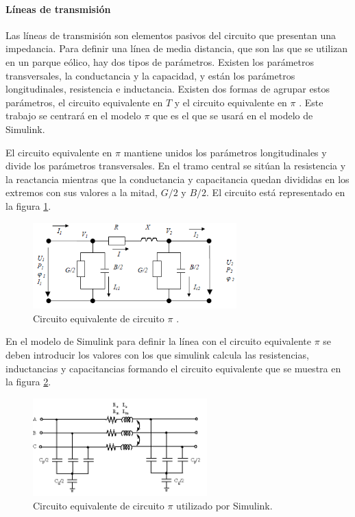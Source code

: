 \documentclass{book}
\begin{document}
		\paragraph {L\'ineas de transmisi\'on}

Las l\'ineas de transmisi\'on son elementos pasivos del circuito que presentan una impedancia. Para definir una l\'inea de media distancia, que son las que se utilizan en un parque e\'olico, hay dos tipos de par\'ametros. Existen los par\'ametros transversales, la conductancia y la capacidad, y est\'an los  par\'ametros longitudinales, resistencia e inductancia. Existen dos formas de agrupar estos par\'ametros, el circuito equivalente en $T$ y el circuito equivalente en $\pi$ \cite{LibroRedesLineas}. Este trabajo se centrar\'a en el modelo $\pi$ que es el que se usar\'a en el modelo de Simulink.  \par

El circuito equivalente en $\pi$ mantiene unidos los par\'ametros longitudinales y divide los par\'ametros transversales. En el tramo central se sit\'uan la resistencia y la reactancia mientras que la conductancia y capacitancia quedan divididas en los extremos con sus valores a la mitad, $G/2$ y $B/2$. El circuito est\'a representado en la figura \ref{CircuitoPi}. \par 

\begin{figure}[h!]
\centering
\includegraphics[width=0.7\textwidth]{CircuitoPi.PNG}
\caption{Circuito equivalente de circuito $\pi$ \cite{LibroRedesLineas}. }
\label{CircuitoPi}
\end{figure} \par

En el modelo de Simulink para definir la l\'inea con el circuito equivalente  $\pi$ se deben introducir los valores con los que simulink calcula las resistencias, inductancias y capacitancias formando el circuito equivalente que se muestra en la figura \ref{PiSectionSimulink}.  \par 

\begin{figure}[h!]
\centering
\includegraphics[width=0.6\textwidth]{PiSectionSimulink.PNG}
\caption{Circuito equivalente de circuito $\pi$ utilizado por Simulink. }
\label{PiSectionSimulink}
\end{figure} \par
\end{document}
